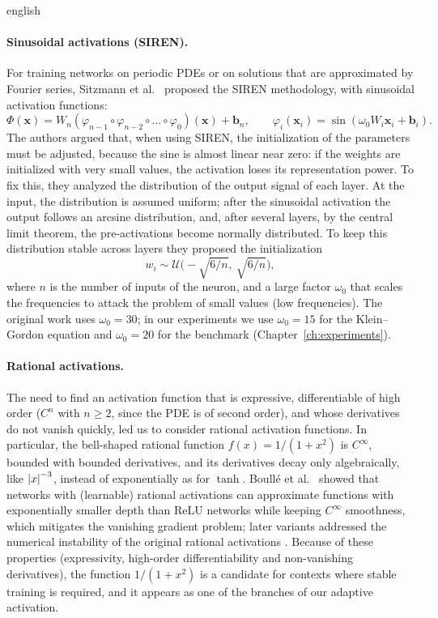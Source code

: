 \documentclass[../0000.tex]{subfiles}
\begin{document}
\begin{hyphenrules}{english}
\paragraph{Sinusoidal activations (SIREN).}
For training networks on periodic PDEs or on solutions that are approximated by Fourier series,
Sitzmann et al.~\cite{sitzmann2020} proposed the SIREN methodology, with sinusoidal activation functions:
\begin{equation}
  \Phi(\mathbf{x})=W_n(\varphi_{n-1}\circ\varphi_{n-2}\circ\dots\circ\varphi_0)(\mathbf{x})+\mathbf{b}_n,\qquad
  \varphi_i(\mathbf{x}_i)=\sin(\omega_0W_i\mathbf{x}_i+\mathbf{b}_i).
  \label{eq:siren}
\end{equation}
The authors argued that, when using SIREN, the initialization of the parameters must be adjusted, because
the sine is almost linear near zero: if the weights are initialized with very small values, the activation
loses its representation power. To fix this, they analyzed the distribution of the output signal of each
layer. At the input, the distribution is assumed uniform; after the sinusoidal activation the output
follows an arcsine distribution, and, after several layers, by the central limit theorem, the
pre-activations become normally distributed. To keep this distribution stable across layers they proposed
the initialization
\begin{equation}
  w_i\sim\mathcal{U}\Big(-\sqrt{6/n},\ \sqrt{6/n}\Big),
  \label{eq:siren-init}
\end{equation}
where $n$ is the number of inputs of the neuron, and a large factor $\omega_0$ that scales the frequencies
to attack the problem of small values (low frequencies). The original work uses $\omega_0=30$; in our
experiments we use $\omega_0=15$ for the Klein--Gordon equation and $\omega_0=20$ for the benchmark
(Chapter~\ref{ch:experiments}).

\paragraph{Rational activations.}
The need to find an activation function that is expressive, differentiable of high order ($C^n$ with
$n\ge2$, since the PDE is of second order), and whose derivatives do not vanish quickly, led us to
consider rational activation functions. In particular, the bell-shaped rational function
$f(x)=1/(1+x^2)$ is $C^\infty$, bounded with bounded derivatives, and its derivatives decay only
algebraically, like $\left\lvert x \right\rvert^{-3}$, instead of exponentially as for $\tanh$. Boull{\'e} et al.~\cite{boulle2020} showed
that networks with (learnable) rational activations can approximate functions with exponentially smaller
depth than ReLU networks while keeping $C^\infty$ smoothness, which mitigates the vanishing gradient
problem; later variants addressed the numerical instability of the original rational activations
\cite{dubey2022}. Because of these properties (expressivity, high-order differentiability and
non-vanishing derivatives), the function $1/(1+x^2)$ is a candidate for contexts where stable training is
required, and it appears as one of the branches of our adaptive activation.


\end{hyphenrules}
\end{document}
